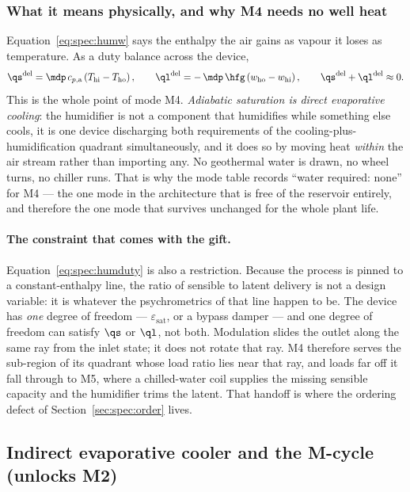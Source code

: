 \subsubsection{What it means physically, and why M4 needs no well heat}
Equation~\eqref{eq:spec:humw} says the enthalpy the air gains as vapour it loses as temperature. As a
duty balance across the device,
\begin{equation}
\qs^{\mathrm{del}} = \mdp\,c_{p,\mathrm{a}}\left(T_{\mathrm{hi}}-T_{\mathrm{ho}}\right),
\qquad
\ql^{\mathrm{del}} = -\,\mdp\,\hfg\left(w_{\mathrm{ho}}-w_{\mathrm{hi}}\right),
\qquad
\qs^{\mathrm{del}} + \ql^{\mathrm{del}} \approx 0 .
\label{eq:spec:humduty}
\end{equation}
This is the whole point of mode M4. \emph{Adiabatic saturation is direct evaporative cooling}: the
humidifier is not a component that humidifies while something else cools, it is one device
discharging both requirements of the cooling-plus-humidification quadrant simultaneously, and it does
so by moving heat \emph{within} the air stream rather than importing any. No geothermal water is
drawn, no wheel turns, no chiller runs. That is why the mode table records ``water required: none''
for M4 --- the one mode in the architecture that is free of the reservoir entirely, and therefore the
one mode that survives unchanged for the whole plant life.

\paragraph{The constraint that comes with the gift.} Equation~\eqref{eq:spec:humduty} is also a
restriction. Because the process is pinned to a constant-enthalpy line, the ratio of sensible to
latent delivery is not a design variable: it is whatever the psychrometrics of that line happen to
be. The device has \emph{one} degree of freedom --- $\varepsilon_{\mathrm{sat}}$, or a bypass damper
--- and one degree of freedom can satisfy $\qs$ or $\ql$, not both. Modulation slides the outlet
along the same ray from the inlet state; it does not rotate that ray. M4 therefore serves the
sub-region of its quadrant whose load ratio lies near that ray, and loads far off it fall through to
M5, where a chilled-water coil supplies the missing sensible capacity and the humidifier trims the
latent. That handoff is where the ordering defect of Section~\ref{sec:spec:order} lives.

\subsection{Indirect evaporative cooler and the M-cycle (unlocks M2)}
\label{sec:spec:iec}

